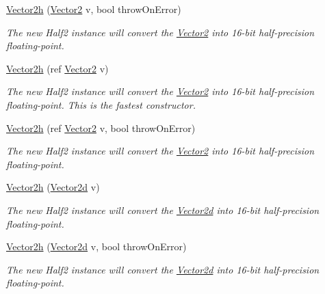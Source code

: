 \begin{DoxyCompactItemize}
\hyperlink{struct_open_t_k_1_1_vector2h_a4c324e9d7a8195530e11a29739b2097a}{Vector2h} (\hyperlink{struct_open_t_k_1_1_vector2}{Vector2} v, bool throw\-On\-Error)
\begin{DoxyCompactList}\small\item\em The new Half2 instance will convert the \hyperlink{struct_open_t_k_1_1_vector2}{Vector2} into 16-\/bit half-\/precision floating-\/point. \end{DoxyCompactList}\item 
\hyperlink{struct_open_t_k_1_1_vector2h_ab0fbb2d879c4b7238be7c8bd34bf4874}{Vector2h} (ref \hyperlink{struct_open_t_k_1_1_vector2}{Vector2} v)
\begin{DoxyCompactList}\small\item\em The new Half2 instance will convert the \hyperlink{struct_open_t_k_1_1_vector2}{Vector2} into 16-\/bit half-\/precision floating-\/point. This is the fastest constructor. \end{DoxyCompactList}\item 
\hyperlink{struct_open_t_k_1_1_vector2h_a466e08f80b28f811601d64db532d8e23}{Vector2h} (ref \hyperlink{struct_open_t_k_1_1_vector2}{Vector2} v, bool throw\-On\-Error)
\begin{DoxyCompactList}\small\item\em The new Half2 instance will convert the \hyperlink{struct_open_t_k_1_1_vector2}{Vector2} into 16-\/bit half-\/precision floating-\/point. \end{DoxyCompactList}\item 
\hyperlink{struct_open_t_k_1_1_vector2h_a025176b5e72b8eab8770dd943582aede}{Vector2h} (\hyperlink{struct_open_t_k_1_1_vector2d}{Vector2d} v)
\begin{DoxyCompactList}\small\item\em The new Half2 instance will convert the \hyperlink{struct_open_t_k_1_1_vector2d}{Vector2d} into 16-\/bit half-\/precision floating-\/point. \end{DoxyCompactList}\item 
\hyperlink{struct_open_t_k_1_1_vector2h_a5056791eb7a6709afa693527539a5fef}{Vector2h} (\hyperlink{struct_open_t_k_1_1_vector2d}{Vector2d} v, bool throw\-On\-Error)
\begin{DoxyCompactList}\small\item\em The new Half2 instance will convert the \hyperlink{struct_open_t_k_1_1_vector2d}{Vector2d} into 16-\/bit half-\/precision floating-\/point. \end{DoxyCompactList}\item 

\end{DoxyCompactItemize}
